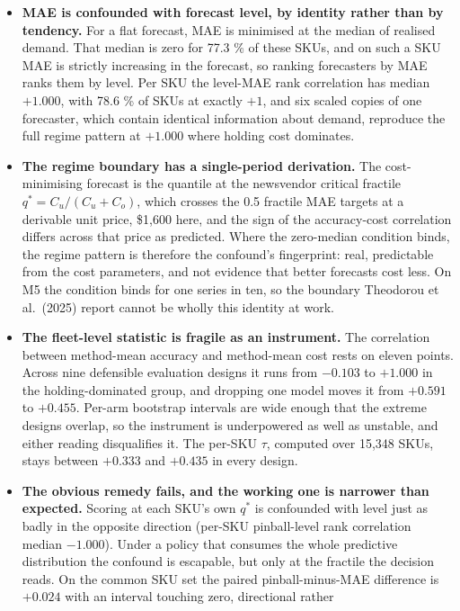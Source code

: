 \documentclass[11pt]{article}
\begin{document}
\begin{itemize}
\item \textbf{MAE is confounded with forecast level, by identity rather than
  by tendency.} For a flat forecast, MAE is minimised at the median of realised
  demand. That median is zero for 77.3 \% of these SKUs, and on such a SKU MAE
  is strictly increasing in the forecast, so ranking forecasters by MAE ranks
  them by level. Per SKU the level-MAE rank correlation has median $+1.000$,
  with 78.6 \% of SKUs at exactly $+1$, and six scaled copies of one
  forecaster, which contain identical information about demand, reproduce the
  full regime pattern at $+1.000$ where holding cost dominates.
\item \textbf{The regime boundary has a single-period derivation.} The
  cost-minimising forecast is the quantile at the newsvendor critical fractile
  $q^\ast = C_u/(C_u+C_o)$, which crosses the 0.5 fractile MAE targets at a
  derivable unit price, \$1{,}600 here, and the sign of the accuracy-cost
  correlation differs across that price as predicted. Where the zero-median condition binds, the regime pattern is
  therefore the confound's fingerprint: real, predictable from the cost
  parameters, and not evidence that better forecasts cost less. On M5 the
  condition binds for one series in ten, so the boundary Theodorou et al.\
  (2025) report cannot be wholly this identity at work.
\item \textbf{The fleet-level statistic is fragile as an instrument.} The
  correlation between method-mean accuracy and method-mean cost rests on
  eleven points. Across nine defensible evaluation designs it runs from
  $-0.103$ to $+1.000$ in the holding-dominated group, and dropping one model
  moves it from $+0.591$ to $+0.455$. Per-arm bootstrap intervals are wide
  enough that the extreme designs overlap, so the instrument is underpowered
  as well as unstable, and either reading disqualifies it. The per-SKU
  $\tau$, computed over 15{,}348 SKUs, stays between $+0.333$ and $+0.435$ in
  every design.
\item \textbf{The obvious remedy fails, and the working one is narrower than
  expected.} Scoring at each SKU's own $q^\ast$ is confounded with level just
  as badly in the opposite direction (per-SKU pinball-level rank correlation
  median $-1.000$). Under a policy that consumes the whole predictive
  distribution the confound is escapable, but only at the fractile the
  decision reads. On the common SKU set the paired pinball-minus-MAE
  difference is $+0.024$ with an interval touching zero, directional rather

\end{itemize}
\end{document}
